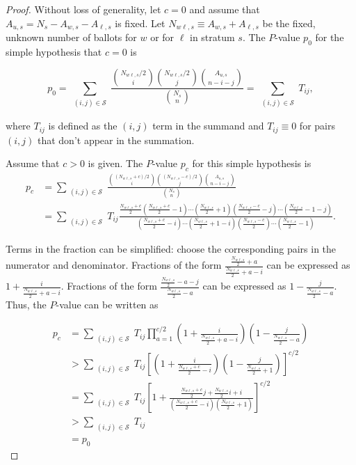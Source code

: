 \begin{proof}
Without loss of generality, let $c=0$ and assume that $A_{u,s}=N_s - A_{w,s} - A_{\ell,s}$ is fixed.
Let $N_{w\ell, s} \equiv A_{w,s}+A_{\ell,s}$ be the fixed, unknown number of ballots for $w$ or for $\ell$ in stratum $s$.
The $P$-value $p_0$ for the simple hypothesis that $c=0$ is

\begin{equation}
  p_0 = \sum_{\substack{(i, j) \in \mathcal{S}}} \frac{ {N_{w\ell, s}/2 \choose i}{N_{w\ell, s}/2 \choose j}{A_{u,s} \choose n-i-j}}{{N_s \choose n}} =  \sum_{\substack{(i, j) \in \mathcal{S}}}T_{ij},
\end{equation}

\noindent where $T_{ij}$ is defined as the $(i, j)$ term in the summand and $T_{ij} \equiv 0$ for pairs $(i, j)$ that don't appear in the summation.

Assume that $c>0$ is given.
The $P$-value $p_c$ for this simple hypothesis is
\begin{align*}
p_c &=   \sum_{\substack{(i, j) \in \mathcal{S}}}  \frac{ {(N_{w\ell, s}+c)/2 \choose i}{(N_{w\ell, s}-c)/2 \choose j}{A_{u,s} \choose n-i-j}}{{N_s \choose n}}  \\
   &=\sum_{\substack{(i, j) \in \mathcal{S}}} T_{ij} \frac{ \frac{N_{w\ell, s}+c}{2}(\frac{N_{w\ell, s}+c}{2}-1)\cdots(\frac{N_{w\ell, s}}{2}+1) (\frac{N_{w\ell, s}-c}{2} -j)\cdots(\frac{N_{w\ell, s}}{2}-1-j) }
   {(\frac{N_{w\ell, s}+c}{2} -i)\cdots(\frac{N_{w\ell, s}}{2}+1-i)(\frac{N_{w\ell, s}-c}{2})\cdots(\frac{N_{w\ell, s}}{2}-1)}.
\end{align*}

Terms in the fraction can be simplified: choose the corresponding pairs in the numerator and denominator.
Fractions of the form $\frac{\frac{N_{w\ell, s}}{2} + a}{\frac{N_{w\ell,s}}{2} + a - i}$ can be expressed as $1 + \frac{i}{\frac{N_{w\ell,s}}{2} + a-i}$.
Fractions of the form $\frac{\frac{N_{w\ell, s}}{2}  - a - j}{\frac{N_{w\ell, s}}{2}  - a}$ can be expressed as $1 - \frac{j}{\frac{N_{w\ell, s}}{2} -a}$.
Thus, the $P$-value can be written as 

\begin{align*}
p_c &= \sum_{\substack{(i, j) \in \mathcal{S}}} T_{ij} \prod_{a=1}^{c/2} \left(1 + \frac{i}{\frac{N_{w\ell,s}}{2} + a-i}\right)\left(1 - \frac{j}{\frac{N_{w\ell, s}}{2} - a}\right) \\
&> \sum_{\substack{(i, j) \in \mathcal{S}}}  T_{ij} \left[ \left(1 + \frac{i}{\frac{N_{w\ell,s}+c}{2} -i}\right)\left(1 - \frac{j}{\frac{N_{w\ell, s}}{2}+1}\right) \right]^{c/2} \\
&= \sum_{\substack{(i, j) \in \mathcal{S}}} T_{ij} \left[ 1 + \frac{\frac{N_{w\ell,s}+c}{2}j + \frac{N_{w\ell,s}}{2}i + i}{(\frac{N_{w\ell,s}+c}{2}-i)(\frac{N_{w\ell,s}}{2}+1)}\right]^{c/2} \\
&> \sum_{\substack{(i, j) \in \mathcal{S}}}  T_{ij}\\
&= p_0
\end{align*}


\end{proof}

